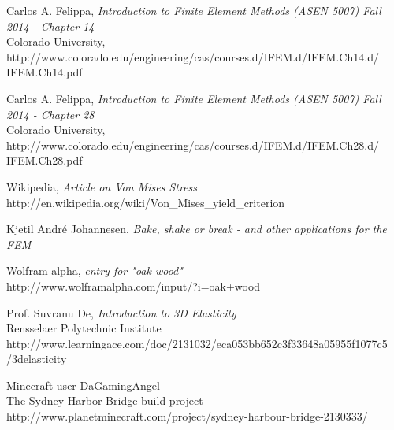 \documentclass[9pt]{extarticle}
\begin{document}
\newpage
\begin{thebibliography}{3}

	Carlos A. Felippa, \emph{Introduction to Finite Element Methods (ASEN 5007) Fall 2014  - Chapter 14} \\
	 Colorado University, \\	http://www.colorado.edu/engineering/cas/courses.d/IFEM.d/IFEM.Ch14.d/\\IFEM.Ch14.pdf



Carlos A. Felippa, \emph{Introduction to Finite Element Methods (ASEN 5007) Fall 2014  - Chapter 28} \\	
 Colorado University, \\	http://www.colorado.edu/engineering/cas/courses.d/IFEM.d/IFEM.Ch28.d/\\IFEM.Ch28.pdf


Wikipedia, \emph{Article on Von Mises Stress} \\
http://en.wikipedia.org/wiki/Von\_Mises\_yield\_criterion

Kjetil André Johannesen, 
\emph{Bake, shake or break - and other applications for the FEM}

	Wolfram alpha, \emph{entry for "oak wood"}\\
	http://www.wolframalpha.com/input/?i=oak+wood
	
	Prof. Suvranu De, \emph{Introduction to 3D Elasticity} \\
	Rensselaer Polytechnic Institute \\
	http://www.learningace.com/doc/2131032/eca053bb652c3f33648a05955f1077c5\\/3delasticity


	Minecraft user DaGamingAngel \\
	The Sydney Harbor Bridge build project \\
	http://www.planetminecraft.com/project/sydney-harbour-bridge-2130333/


\end{thebibliography}
\end{document}
